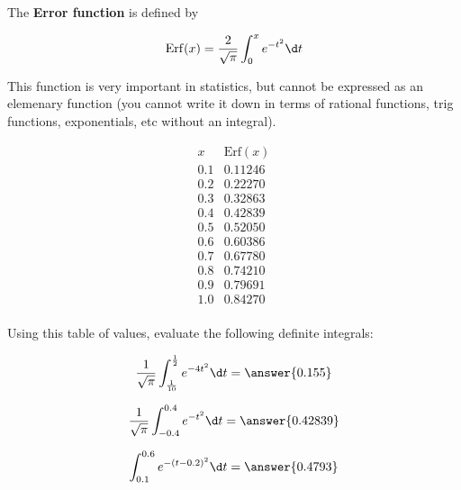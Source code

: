 \documentclass{ximera}
\author{Steven Gubkin}
\begin{document}
\begin{exercise}


The \textbf{Error function} is defined by

\[
\mathrm{Erf}(x) = \frac{2}{\sqrt{\pi}} \int_0^x e^{-t^2} \d t
\]

This function is very important in statistics, but cannot be expressed as an elemenary function (you cannot write it down in terms of rational functions, trig functions, exponentials, etc without an integral).

\[
\begin{array}{c|c}
 x & \mathrm{Erf}(x)\\ \hline
0.1 & 0.11246\\
0.2 & 0.22270\\
0.3 & 0.32863\\
0.4 & 0.42839\\
0.5 & 0.52050\\
0.6 & 0.60386\\
0.7 & 0.67780\\
0.8 & 0.74210\\
0.9 & 0.79691\\
1.0 & 0.84270\\
\end{array}
\]

Using this table of values, evaluate the following definite integrals:

\begin{exercise}
	\[
	\frac{1}{\sqrt{\pi} }\int_\frac{1}{10}^\frac{1}{2} e^{-4t^2} \d t = \answer{0.155}
	\]
\end{exercise}

\begin{exercise}
	\[
	\frac{1}{\sqrt{\pi}} \int_{-0.4}^{0.4} e^{-t^2} \d t = \answer{0.42839}
	\]
\end{exercise}

\begin{exercise}
	\[
	 \int_{0.1}^{0.6} e^{-(t-0.2)^2} \d t = \answer{0.4793}
	\]
\end{exercise}

\end{exercise}
\end{document}

